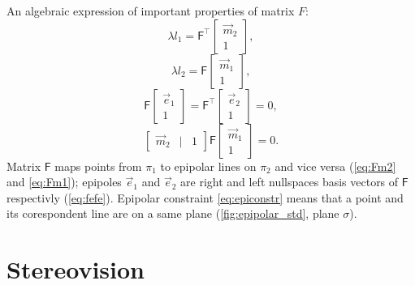 An algebraic expression of important properties of matrix $F$:
\begin{equation}
    \label{eq:Fm2}
    \lambda l_1 = \pmb{\mathsf{F}}^\top \begin{bmatrix} \vec{m}_2 \\ 1 \end{bmatrix},
\end{equation}
\begin{equation}
    \label{eq:Fm1}
    \lambda l_2 = \pmb{\mathsf{F}} \begin{bmatrix} \vec{m}_1 \\ 1 \end{bmatrix},
\end{equation}
\begin{equation}
    \label{eq:fefe}
    \pmb{\mathsf{F}} \begin{bmatrix} \vec{e}_1 \\ 1 \end{bmatrix} = \pmb{\mathsf{F}}^\top \begin{bmatrix} \vec{e}_2 \\ 1 \end{bmatrix} = 0,
\end{equation}
\begin{equation}
    \label{eq:epiconstr}
    \begin{bmatrix} \vec{m}_2 & | & 1 \end{bmatrix} \pmb{\mathsf{F}} \begin{bmatrix} \vec{m}_1 \\ 1 \end{bmatrix} = 0.
\end{equation}
Matrix $\pmb{\mathsf{F}}$ maps points from $\pi_1$ to epipolar lines on $\pi_2$ and vice versa (\autoref{eq:Fm2} and \autoref{eq:Fm1}); epipoles $\vec{e}_1$ and $\vec{e}_2$ are right and left nullspaces basis vectors of $\pmb{\mathsf{F}}$ respectivly (\autoref{eq:fefe}).
Epipolar constraint \autoref{eq:epiconstr} means that a point and its corespondent line are on a same plane (\autoref{fig:epipolar_std}, plane $\sigma$).

\section{Stereovision}

